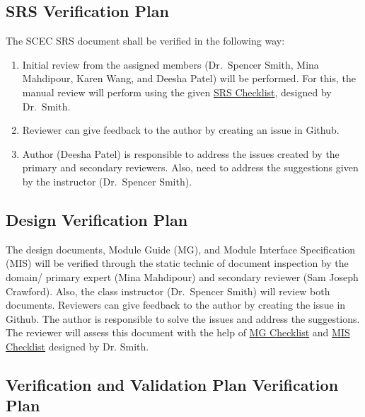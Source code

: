 \documentclass[12pt, titlepage]{article}
\begin{document}
\subsection{SRS Verification Plan}

The SCEC SRS document shall be verified in the following way: 

\begin{enumerate}

\item Initial review from the assigned members (Dr.\ Spencer Smith, Mina Mahdipour, Karen Wang, and Deesha Patel) will be performed. For this, the manual review will perform using the given \href{https://github.com/smiths/capTemplate/blob/9251702fdcb9800c59f6ed3d11d91e2bd62fca6d/docs/Checklists/SRS-Checklist.pdf}{SRS Checklist}, designed by Dr.\ Smith. 

\item Reviewer can give feedback to the author by creating an issue in Github. 

\item Author (Deesha Patel) is responsible to address the issues created by the primary and secondary reviewers. Also, need to address the suggestions given by the instructor (Dr.\ Spencer Smith).  

\end{enumerate}


\subsection{Design Verification Plan}

The design documents, Module Guide (MG), and Module Interface Specification (MIS) will be verified through the static technic of document inspection by the domain/ primary expert (Mina Mahdipour) and secondary reviewer (Sam Joseph Crawford). Also, the class instructor (Dr.\ Spencer Smith) will review both documents. Reviewers can give feedback to the author by creating the issue in Github. The author is responsible to solve the issues and address the suggestions. The reviewer will assess this document with the help of \href{https://github.com/smiths/capTemplate/blob/9251702fdcb9800c59f6ed3d11d91e2bd62fca6d/docs/Checklists/MG-Checklist.pdf}{MG Checklist} and \href{https://github.com/smiths/capTemplate/blob/9251702fdcb9800c59f6ed3d11d91e2bd62fca6d/docs/Checklists/MIS-Checklist.pdf}{MIS Checklist} designed by Dr. Smith. 

\subsection{Verification and Validation Plan Verification Plan}
\end{document}
